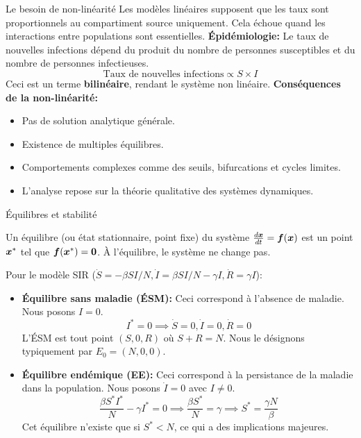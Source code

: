 \documentclass[aspectratio=169]{beamer}\usepackage[]{graphicx}\usepackage[]{xcolor}
\begin{document}
\begin{frame}{Le besoin de non-linéarité}
    Les modèles linéaires supposent que les taux sont proportionnels au compartiment source uniquement. Cela échoue quand les interactions entre populations sont essentielles.
    \vfill
    \textbf{Épidémiologie:} Le taux de nouvelles infections dépend du produit du nombre de personnes susceptibles et du nombre de personnes infectieuses.
    $$ \text{Taux de nouvelles infections} \propto S \times I $$
    Ceci est un terme \textbf{bilinéaire}, rendant le système non linéaire.
    \vfill
    \textbf{Conséquences de la non-linéarité:}
    \begin{itemize}
        \item Pas de solution analytique générale.
        \item Existence de multiples équilibres.
        \item Comportements complexes comme des seuils, bifurcations et cycles limites.
        \item L'analyse repose sur la théorie qualitative des systèmes dynamiques.
    \end{itemize}
\end{frame}

\begin{frame}{Équilibres et stabilité}
    \begin{definition}[Équilibre]
        Un équilibre (ou état stationnaire, point fixe) du système $\frac{d\bm{x}}{dt} = \bm{f}(\bm{x})$ est un point $\bm{x}^*$ tel que $\bm{f}(\bm{x}^*) = \bm{0}$. À l'équilibre, le système ne change pas.
    \end{definition}
    \vfill
    Pour le modèle SIR ($\dot{S}=-\beta SI/N, \dot{I}=\beta SI/N - \gamma I, \dot{R}=\gamma I$):
    \begin{itemize}
        \item \textbf{Équilibre sans maladie (ÉSM):}
        Ceci correspond à l'absence de maladie. Nous posons $I=0$.
        $$ I^* = 0 \implies \dot{S}=0, \dot{I}=0, \dot{R}=0 $$
        L'ÉSM est tout point $(S, 0, R)$ où $S+R=N$. Nous le désignons typiquement par $E_0 = (N, 0, 0)$.
        \item \textbf{Équilibre endémique (EE):}
        Ceci correspond à la persistance de la maladie dans la population. Nous posons $\dot{I}=0$ avec $I \neq 0$.
        $$ \frac{\beta S^* I^*}{N} - \gamma I^* = 0 \implies \frac{\beta S^*}{N} = \gamma \implies S^* = \frac{\gamma N}{\beta} $$
        Cet équilibre n'existe que si $S^* < N$, ce qui a des implications majeures.
    \end{itemize}
\end{frame}
\end{document}
